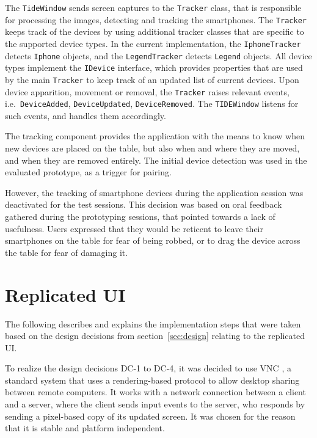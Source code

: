 The \texttt{TideWindow} sends screen captures to the \texttt{Tracker} class, that is responsible for processing the images, detecting and tracking the smartphones.
The \texttt{Tracker} keeps track of the devices by using additional tracker classes that are specific to the supported device types.
In the current implementation, the \texttt{IphoneTracker} detects \texttt{Iphone} objects, and the \texttt{LegendTracker} detects \texttt{Legend} objects.
All device types implement the \texttt{IDevice} interface, which provides properties that are used by the main \texttt{Tracker} to keep track of an updated list of current devices.
Upon device apparition, movement or removal, the \texttt{Tracker} raises relevant events, i.e.\ \texttt{DeviceAdded}, \texttt{DeviceUpdated}, \texttt{DeviceRemoved}.
The \texttt{TIDEWindow} listens for such events, and handles them accordingly.

The tracking component provides the application with the means to know when new devices are placed on the table, but also when and where they are moved, and when they are removed entirely.
The initial device detection was used in the evaluated prototype, as a trigger for pairing.

However, the tracking of smartphone devices during the application session was deactivated for the test sessions.
This decision was based on oral feedback gathered during the prototyping sessions, that pointed towards a lack of usefulness.
Users expressed that they would be reticent to leave their smartphones on the table for fear of being robbed, or to drag the device across the table for fear of damaging it.

\section{Replicated UI}
\label{sec:replicatedui}


The following describes and explains the implementation steps that were taken based on the design decisions from section~\ref{sec:design} relating to the replicated UI.

To realize the design decisions DC-1 to DC-4, it was decided to use VNC \citep{Richardson:1998:vnc}, a standard system that uses a rendering-based protocol to allow desktop sharing between remote computers.
It works with a network connection between a client and a server, where the client sends input events to the server, who responds by sending a pixel-based copy of its updated screen.
It was chosen for the reason that it is stable and platform independent.

